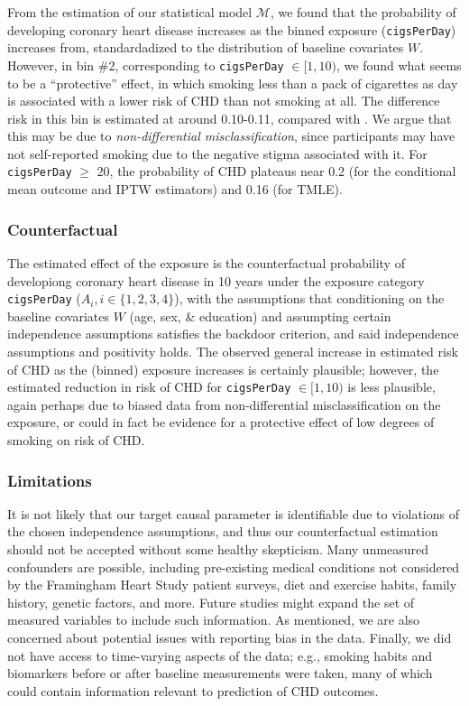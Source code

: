 \documentclass[]{article}
\begin{document}
From the estimation of our statistical model \(\mathcal{M}\), we found
that the probability of developing coronary heart disease increases as
the binned exposure (\texttt{cigsPerDay}) increases from, standardadized
to the distribution of baseline covariates \(W\). However, in bin \#2,
corresponding to \texttt{cigsPerDay} \(\in [1, 10)\), we found what
seems to be a ``protective'' effect, in which smoking less than a pack
of cigarettes as day is associated with a lower risk of CHD than not
smoking at all. The difference risk in this bin is estimated at around
0.10-0.11, compared with . We argue that this may be due to
\textit{non-differential misclassification}, since participants may have
not self-reported smoking due to the negative stigma associated with it.
For \texttt{cigsPerDay} \(\geq\) 20, the probability of CHD plateaus
near 0.2 (for the conditional mean outcome and IPTW estimators) and 0.16
(for TMLE).

\hypertarget{counterfactual}{%
\subsubsection{Counterfactual}\label{counterfactual}}

The estimated effect of the exposure is the counterfactual probability
of developiong coronary heart disease in 10 years under the exposure
category \texttt{cigsPerDay} (\(A_i, i \in \{1, 2, 3, 4 \}\)), with the
assumptions that conditioning on the baseline covariates \(W\) (age,
sex, \& education) and assumpting certain independence assumptions
satisfies the backdoor criterion, and said independence assumptions and
positivity holds. The observed general increase in estimated risk of CHD
as the (binned) exposure increases is certainly plausible; however, the
estimated reduction in risk of CHD for \texttt{cigsPerDay}
\(\in [1, 10)\) is less plausible, again perhaps due to biased data from
non-differential misclassification on the exposure, or could in fact be
evidence for a protective effect of low degrees of smoking on risk of
CHD.

\hypertarget{limitations}{%
\subsubsection{Limitations}\label{limitations}}

It is not likely that our target causal parameter is identifiable due to
violations of the chosen independence assumptions, and thus our
counterfactual estimation should not be accepted without some healthy
skepticism. Many unmeasured confounders are possible, including
pre-existing medical conditions not considered by the Framingham Heart
Study patient surveys, diet and exercise habits, family history, genetic
factors, and more. Future studies might expand the set of measured
variables to include such information. As mentioned, we are also
concerned about potential issues with reporting bias in the data.
Finally, we did not have access to time-varying aspects of the data;
e.g., smoking habits and biomarkers before or after baseline
measurements were taken, many of which could contain information
relevant to prediction of CHD outcomes.
\end{document}
